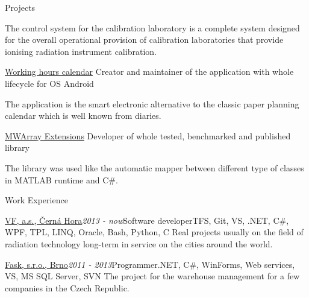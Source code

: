 \documentclass{cv} %
\begin{document}
\begin{rSection}{Projects}
\begin{rSubsection}
The control system for the calibration laboratory is a complete system designed for the overall operational provision of calibration laboratories that provide ionising radiation instrument calibration.
\end{rSubsection}

\begin{rSubsection}
{\href{https://play.google.com/store/apps/details?id=eu.jksoft.planningcalendar}{Working hours calendar}}{}
{Creator and maintainer of the application with whole lifecycle for OS Android}{}

The application is the smart electronic alternative to the classic paper planning calendar which is well known from diaries.
\end{rSubsection}

\begin{rSubsection}
{\href{http://honzakuzel.eu/mwarrayextensions.html}{MWArray Extensions}}{}
{Developer of whole tested, benchmarked and published library}{}

The library was used like the automatic mapper between different type of classes in MATLAB runtime and C\#.
\end{rSubsection}

\end{rSection}


\begin{rSection}{Work Experience}

\begin{rSubsection}{\href{https://www.vfnuclear.com/en/}{VF, a.s., \v Cern\' a Hora}}{\em 2013 - now}{Software developer}{TFS, Git, VS, .NET, C\#, WPF, TPL, LINQ, Oracle, Bash, Python, C}
Real projects usually on the field of radiation technology long-term in service on the cities around the world.
\end{rSubsection}

\begin{rSubsection}{\href{http://www.fask.cz/}{Fask, s.r.o., Brno}}{\em 2011 - 2013}{Programmer}{.NET, C\#, WinForms, Web services, VS, MS SQL Server, SVN}
The project for the warehouse management for a few companies in the Czech Republic.
\end{rSubsection}

\end{rSection}
\end{document}
